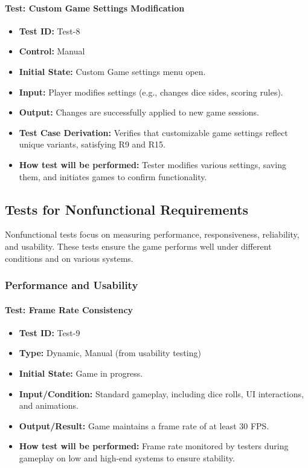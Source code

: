 \documentclass[12pt, titlepage]{article}
\begin{document}
\paragraph{\label{test-8}Test: Custom Game Settings Modification}
\begin{itemize}
    \item \textbf{Test ID:} Test-8
    \item \textbf{Control:} Manual
    \item \textbf{Initial State:} Custom Game settings menu open.
    \item \textbf{Input:} Player modifies settings (e.g., changes dice sides, scoring rules).
    \item \textbf{Output:} Changes are successfully applied to new game sessions.
    \item \textbf{Test Case Derivation:} Verifies that customizable game settings reflect unique variants, satisfying R9 and R15.
    \item \textbf{How test will be performed:} Tester modifies various settings, saving them, and initiates games to confirm functionality.
\end{itemize}

\subsection{Tests for Nonfunctional Requirements}

Nonfunctional tests focus on measuring performance, responsiveness, reliability, and usability. These tests ensure the game performs well under different conditions and on various systems.

\subsubsection{Performance and Usability}

\paragraph{\label{test-9}Test: Frame Rate Consistency}
\begin{itemize}
    \item \textbf{Test ID:} Test-9
    \item \textbf{Type:} Dynamic, Manual (from usability testing)
    \item \textbf{Initial State:} Game in progress.
    \item \textbf{Input/Condition:} Standard gameplay, including dice rolls, UI interactions, and animations.
    \item \textbf{Output/Result:} Game maintains a frame rate of at least 30 FPS.
    \item \textbf{How test will be performed:} Frame rate monitored by testers during gameplay on low and high-end systems to ensure stability.
\end{itemize}
\end{document}
